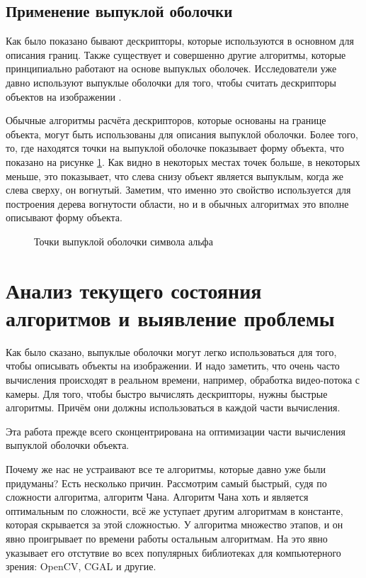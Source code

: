 \subsection{Применение выпуклой оболочки}

Как было показано бывают дескрипторы, которые используются в основном для описания границ. Также существует и совершенно другие алгоритмы, которые принципиально работают на основе выпуклых оболочек. Исследователи уже давно используют выпуклые оболочки для того, чтобы считать дескрипторы объектов на изображении \cite{dalitz2013fourier, mathew2015content, sonka2014image}.

Обычные алгоритмы расчёта дескрипторов, которые основаны на границе объекта, могут быть использованы для описания выпуклой оболочки. Более того, то, где находятся точки на выпуклой оболочке показывает форму объекта, что показано на рисунке \ref{img:alpha_convex_hull}. Как видно в некоторых местах точек больше, в некоторых меньше, это показывает, что слева снизу объект является выпуклым, когда же слева сверху, он вогнутый. Заметим, что именно это свойство используется для построения дерева вогнутости области, но и в обычных алгоритмах это вполне описывают форму объекта.

\begin{figure}[H]
	\centering
	
	\caption{Точки выпуклой оболочки символа альфа}
	\label{img:alpha_convex_hull}
\end{figure}

\section{Анализ текущего состояния алгоритмов и выявление проблемы} \label{sect1_2}

Как было сказано, выпуклые оболочки могут легко использоваться для того, чтобы описывать объекты на изображении. И надо заметить, что очень часто вычисления происходят в реальном времени, например, обработка видео-потока с камеры. Для того, чтобы быстро вычислять дескрипторы, нужны быстрые алгоритмы. Причём они должны использоваться в каждой части вычисления.

Эта работа прежде всего сконцентрирована на оптимизации части вычисления выпуклой оболочки объекта.

Почему же нас не устраивают все те алгоритмы, которые давно уже были придуманы? Есть несколько причин. Рассмотрим самый быстрый, судя по сложности алгоритма, алгоритм Чана. Алгоритм Чана хоть и является оптимальным по сложности, всё же уступает другим алгоритмам в константе, которая скрывается за этой сложностью. У алгоритма множество этапов, и он явно проигрывает по времени работы остальным алгоритмам. На это явно указывает его отстутвие во всех популярных библиотеках для компьютерного зрения: OpenCV\cite{opencvconvexhull}, CGAL\cite{cgalconvexhull} и другие.

